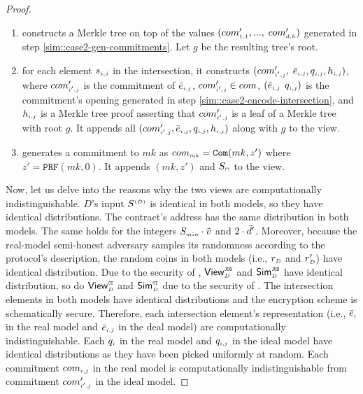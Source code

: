 \begin{proof}
\begin{enumerate}
 
 
 \item constructs a  Merkle tree on top of the values $(com'_{\scriptscriptstyle 1,1}, ..., $ $com'_{\scriptscriptstyle d, h})$ generated in step \ref{sim::case2-gen-commitments}. Let $g$ be the resulting tree's root.  
 \item for each element $s_{\scriptscriptstyle i,j}$ in the intersection, it constructs $(com'_{\scriptscriptstyle i',j}, $ $ \bar{e}_{\scriptscriptstyle i,j}, q_{\scriptscriptstyle i,j}, h_{\scriptscriptstyle i,j})$, where $com'_{\scriptscriptstyle i',j}$ is the commitment of $ \bar{e}_{\scriptscriptstyle i,j}$, $com'_{\scriptscriptstyle i',j}\in com$,  $(\bar{e}_{\scriptscriptstyle i,j}$ $q_{\scriptscriptstyle i,j})$ is the commitment's opening generated in step \ref{sim::case2-encode-intersection}, and $h_{\scriptscriptstyle i,j}$ is a Merkle tree proof asserting that $com'_{\scriptscriptstyle i',j}$ is a leaf of a Merkle tree with root $g$. It appends all  $(com'_{\scriptscriptstyle i',j}, \bar{e}_{\scriptscriptstyle i,j}, q_{\scriptscriptstyle i,j}, h_{\scriptscriptstyle i,j})$ along with $g$ to the view. 
 
\item generates a commitment to $mk$ as $com_{\scriptscriptstyle mk}=\mathtt{Com}(mk, z')$ where $z'=\mathtt{PRF}(mk, 0)$. It appends $(mk, z')$  and  $S_{\scriptscriptstyle \cap}$ to the view. 

%
\end{enumerate}
 

Now, let us delve into the reasons why the two views are computationally indistinguishable. $D$'s input $S^{\scriptscriptstyle (D)}$ is
 identical in both models, so they have identical distributions.  The contract's address has the same distribution in both models. The same holds for the integers $S_{\scriptscriptstyle min}\cdot \ddot{v}$ and $ 2\cdot \ddot{d}'$. Moreover, because the real-model semi-honest adversary samples its randomness according to the protocol’s description, the random coins in both models (i.e., $r_{\scriptscriptstyle D}$  and $r'_{\scriptscriptstyle D}$) have identical distribution. Due to the security of \fpsi, $\mathsf{View}^{\scriptscriptstyle \mathtt{JUS}}_{\scriptscriptstyle D}$ and $\mathsf{Sim}^{\scriptscriptstyle \mathtt{JUS}}_{\scriptscriptstyle D}$ have identical distribution, so do  $\mathsf{View}^{\scriptscriptstyle \mathtt{CT}}_{\scriptscriptstyle D}$ and $\mathsf{Sim}^{\scriptscriptstyle \mathtt{CT}}_{\scriptscriptstyle D}$ due to the security of \ct. The intersection elements in both models have identical distributions and the encryption scheme is schematically secure. Therefore, each intersection element's representation (i.e., $\bar{e}_{\scriptscriptstyle i}$ in the real model and $\bar{e}_{\scriptscriptstyle i, j}$ in the deal model) are computationally indistinguishable. Each $q_{\scriptscriptstyle i}$ in the real model and $q_{\scriptscriptstyle i, j}$ in the ideal model have identical distributions as they have been picked uniformly at random. Each commitment $com_{\scriptscriptstyle i,j}$ in the real model is computationally indistinguishable from commitment $com'_{\scriptscriptstyle i',j}$ in the ideal model. 
 

\end{proof}
